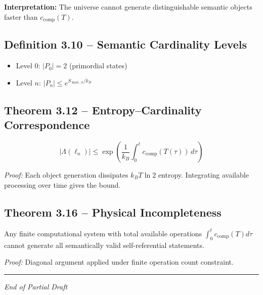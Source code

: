 \documentclass{article}
\begin{document}
\textbf{Interpretation:} The universe cannot generate distinguishable semantic objects faster than \(c_{\mathrm{comp}}(T)\).

\subsection{Definition 3.10 – Semantic Cardinality Levels}
\begin{itemize}
\item Level 0: \(|P_0| = 2\) (primordial states)
\item Level \(n\): \(|P_n| \leq e^{S_{\max,n} / k_B}\)
\end{itemize}

\subsection{Theorem 3.12 – Entropy–Cardinality Correspondence}
\[
|\Lambda(\ell_n)| \leq \exp \left( \frac{1}{k_B} \int_0^t c_{\mathrm{comp}}(T(\tau)) \, d\tau \right)
\]

\emph{Proof:} Each object generation dissipates \(k_B T \ln 2\) entropy. Integrating available processing over time gives the bound.

\subsection{Theorem 3.16 – Physical Incompleteness}
Any finite computational system with total available operations \( \int_0^t c_{\mathrm{comp}}(T) d\tau \) cannot generate all semantically valid self-referential statements.

\emph{Proof:} Diagonal argument applied under finite operation count constraint.

\hrule

\emph{End of Partial Draft}
\end{document}
